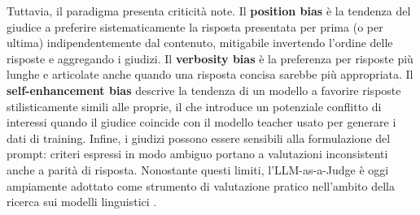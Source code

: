 Tuttavia, il paradigma presenta criticità note. Il \textbf{position
bias} è la tendenza del giudice a preferire sistematicamente la
risposta presentata per prima (o per ultima) indipendentemente dal
contenuto, mitigabile invertendo l'ordine delle risposte e
aggregando i giudizi. Il \textbf{verbosity bias} è la preferenza
per risposte più lunghe e articolate anche quando una risposta
concisa sarebbe più appropriata. Il \textbf{self-enhancement bias}
descrive la tendenza di un modello a favorire risposte stilisticamente
simili alle proprie, il che introduce un potenziale conflitto di
interessi quando il giudice coincide con il modello teacher usato
per generare i dati di training. Infine, i giudizi possono essere
sensibili alla formulazione del prompt: criteri espressi in modo
ambiguo portano a valutazioni inconsistenti anche a parità di risposta.
Nonostante questi limiti, l'LLM-as-a-Judge è oggi ampiamente adottato
come strumento di valutazione pratico nell'ambito della ricerca
sui modelli linguistici \cite{zheng2023judging}.